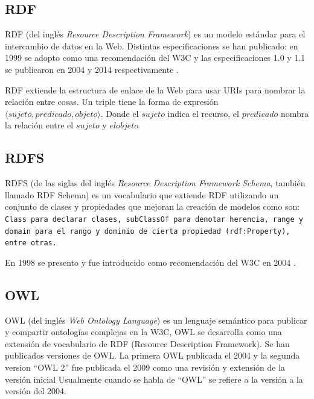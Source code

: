 \subsection{RDF}\label{sw:rdf}
RDF (del inglés \emph{Resource Description Framework}) es un modelo estándar para el intercambio de datos en la Web. 
Distintas especificaciones se han publicado: en 1999 se adopto como una recomendación del W3C y las especificaciones 1.0 y 1.1 se publicaron en 2004 y 2014 respectivamente \cite{bikakis2013semantic}.

RDF extiende la estructura de enlace de la Web para usar URIs para nombrar la relación entre cosas. Un triple tiene la forma de expresión  $\langle sujeto, predicado, objeto \rangle$. Donde el $sujeto$ indica el recurso, el $predicado$ nombra la relación entre el $sujeto$ y $el objeto$

\subsection{RDFS}
RDFS (de las siglas del inglés \emph{Resource Description Framework Schema},
también llamado RDF Schema) es un vocabulario que extiende RDF utilizando un
conjunto de clases y propiedades que mejoran la creación de modelos como son:
\tt{Class} para declarar clases, \tt{subClassOf} para denotar herencia,
\tt{range} y \tt{domain} para el rango y dominio de cierta propiedad
(\tt{rdf:Property}), entre otras.

En 1998 se presento y fue introducido como recomendación del W3C en 2004
\cite{bikakis2013semantic}.

\subsection{OWL}

OWL (del inglés \emph{Web Ontology Language}) es un lenguaje semántico para publicar y compartir ontologías complejas en la W3C, OWL se desarrolla como una extensión de vocabulario de RDF (Resource Description Framework). 
Se han publicados versiones de OWL. La primera OWL publicada el 2004 y la segunda version ``OWL 2'' fue publicada el 2009 como una revisión y extensión de la versión inicial Usualmente cuando se habla de ``OWL'' se refiere a la versión a la versión del 2004.
